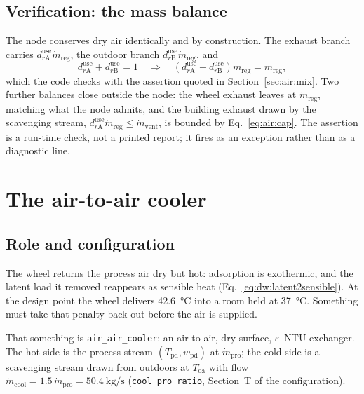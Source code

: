 \documentclass[11pt]{article}
\providecommand{\celsius}{\degreeCelsius}
\newcommand{\md}{\ensuremath{\dot m}}
\newcommand{\mdp}{\ensuremath{\dot m_{\mathrm{pro}}}}
\newcommand{\mdr}{\ensuremath{\dot m_{\mathrm{reg}}}}
\newcommand{\mdv}{\ensuremath{\dot m_{\mathrm{vent}}}}
\begin{document}
\subsection{Verification: the mass balance}
\label{sec:air:massbal}

The node conserves dry air identically and by construction. The exhaust branch
carries $d_{r\mathrm{A}}^{\mathrm{use}}\mdr$, the outdoor branch
$d_{r\mathrm{B}}^{\mathrm{use}}\mdr$, and
\begin{equation}
d_{r\mathrm{A}}^{\mathrm{use}} + d_{r\mathrm{B}}^{\mathrm{use}} = 1
\quad\Longrightarrow\quad
\left(d_{r\mathrm{A}}^{\mathrm{use}}+d_{r\mathrm{B}}^{\mathrm{use}}\right)\mdr
= \mdr ,
\label{eq:air:massbal}
\end{equation}
which the code checks with the assertion quoted in
Section~\ref{sec:air:mix}. Two further balances close outside the node: the
wheel exhaust leaves at $\mdr$, matching what the node admits, and the
building exhaust drawn by the scavenging stream,
$d_{r\mathrm{A}}^{\mathrm{use}}\mdr \le \mdv$, is bounded by
Eq.~\eqref{eq:air:cap}. The assertion is a run-time check, not a printed
report; it fires as an exception rather than as a diagnostic line.

\section{The air-to-air cooler}
\label{sec:air:cooler}

\subsection{Role and configuration}
\label{sec:air:coolerrole}

The wheel returns the process air dry but hot: adsorption is exothermic, and
the latent load it removed reappears as sensible heat
(Eq.~\eqref{eq:dw:latent2sensible}). At the design point the wheel delivers
\SI{42.6}{\celsius} into a room held at \SI{37}{\celsius}. Something must take
that penalty back out before the air is supplied.

That something is \texttt{air\_air\_cooler}: an air-to-air, dry-surface,
$\varepsilon$--NTU exchanger. The hot side is the process stream
$(T_{\mathrm{pd}},w_{\mathrm{pd}})$ at $\mdp$; the cold side is a scavenging
stream drawn from outdoors at $T_{\mathrm{oa}}$ with flow
$\md_{\mathrm{cool}} = 1.5\,\mdp = \SI{50.4}{\kilogram\per\second}$
(\texttt{cool\_pro\_ratio}, Section~T of the configuration).
\end{document}
